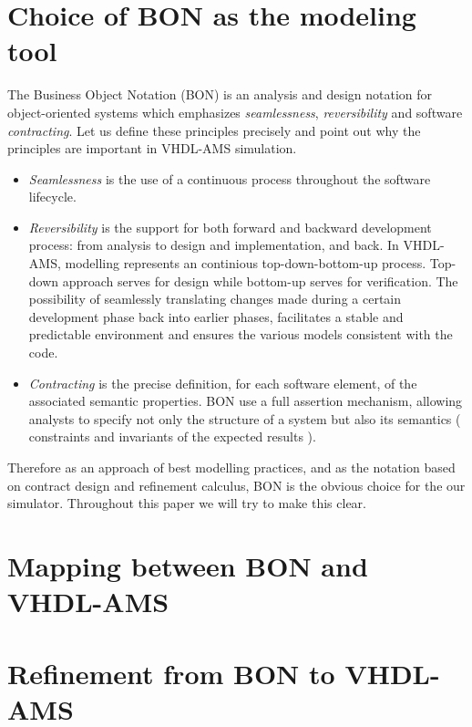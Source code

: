 \documentclass{article}
\newcommand{\todo}{\textbf{TODO:}}
\begin{document}
\section{Choice of BON as the modeling tool}
The Business Object Notation (BON) is an analysis and design notation 
for object-oriented systems  which emphasizes \emph{seamlessness}, 
\emph{reversibility} and software \emph{contracting}. Let us define 
these principles precisely and point out why the principles are 
important in VHDL-AMS simulation.
\begin{itemize}
\item \emph{Seamlessness} is the use of a continuous process 
throughout the software lifecycle.
\item \emph{Reversibility} is the support for both forward and 
backward development process: from analysis to design 
and implementation, and back.
In VHDL-AMS, modelling represents an continious top-down-bottom-up
process. Top-down approach serves for design while bottom-up
serves for verification. The possibility of seamlessly translating 
changes made during a certain development phase back into earlier phases,
facilitates a stable and predictable environment and ensures the various 
models consistent with the code.
\item \emph{Contracting} is the precise definition, for each software element, 
of the associated semantic properties. BON use a full assertion mechanism, 
allowing analysts to specify not only the structure of a system but also its
semantics ( constraints and invariants of the expected results ).
\end{itemize}

Therefore as an approach of best modelling practices, and as the notation 
based on contract design and refinement calculus, BON is the obvious choice 
for the our simulator.
Throughout this paper we will try to make this clear.  
\section{Mapping between BON and VHDL-AMS}

\section{Refinement from BON to VHDL-AMS}
 
\end{document}
